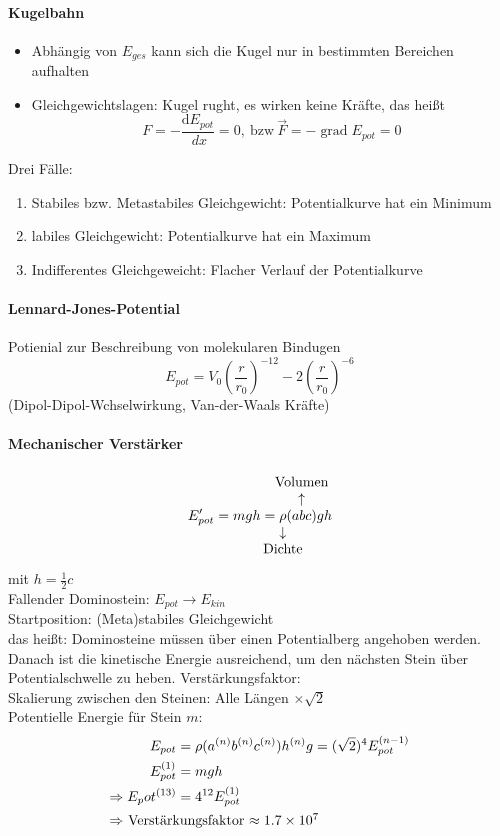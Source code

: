 \documentclass[a4paper]{scrartcl}
\DeclareMathOperator{\grad}{grad}
\renewcommand{\d}{\mathrm{d}}
\renewcommand{\v}[1]{\vec{#1}}
\newcommand{\dd}[2]{\frac{\d #1}{\ d#2}}
\theoremstyle{definition}
\theoremstyle{plain}
\theoremstyle{plain}
\theoremstyle{remark}
\theoremstyle{remark}
\theoremstyle{remark}
\begin{document}
\paragraph{Kugelbahn}
\label{sec-5-1-3-1}
\begin{itemize}
\item Abhängig von $E_{ges}$ kann sich die Kugel nur in bestimmten Bereichen aufhalten
\item Gleichgewichtslagen: Kugel rught, es wirken keine Kräfte, das heißt
\[F = -\dd{E_{pot}}{x} = 0, ~\text{bzw}~ \v F = -\grad E_{pot} = 0\]
\end{itemize}

Drei Fälle:
\begin{enumerate}
\item Stabiles bzw. Metastabiles Gleichgewicht: Potentialkurve hat ein Minimum
\item labiles Gleichgewicht: Potentialkurve hat ein Maximum
\item Indifferentes Gleichgeweicht: Flacher Verlauf der Potentialkurve
\end{enumerate}
\paragraph{Lennard-Jones-Potential}
\label{sec-5-1-3-2}
Potienial zur Beschreibung von molekularen Bindugen
\[E_{pot} = V_0 (\frac{r}{r_0})^{-12} - 2(\frac{r}{r_0})^{-6}\]
(Dipol-Dipol-Wchselwirkung, Van-der-Waals Kräfte)
\paragraph{Mechanischer Verstärker}
\label{sec-5-1-3-3}
\[E_{pot}' = m g h = \underarrow[\rho]{Dichte} \overarrow[(a b c)]{Volumen} g h\]
mit $h = \frac{1}{2}c$ \\
     Fallender Dominostein: $E_{pot}  \to E_{kin}$ \\
     Startposition: (Meta)stabiles Gleichgewicht \\
     das heißt: Dominosteine müssen über einen Potentialberg angehoben werden. Danach ist die kinetische Energie
ausreichend, um den nächsten Stein über Potentialschwelle zu heben.
Verstärkungsfaktor: \\
     Skalierung zwischen den Steinen: Alle Längen $\times \sqrt{2}$ \\
     Potentielle Energie für Stein $m$:
\begin{align*}
E_{pot} &= \rho(a^{(n)}b^{(n)}c^{(n)}) h^{(n)} g = (\sqrt{2})^4 E_{pot}^{(n-1)} \\
E_{pot}^{(1)} &= m g h \\
\Rightarrow E_pot^{(13)} &= 4^{12} E_{pot}^{(1)} \\
\intertext{$\Rightarrow$ Verstärkungsfaktor $\approx \SI{1.7e7}{}$}
\end{align*}
\end{document}
